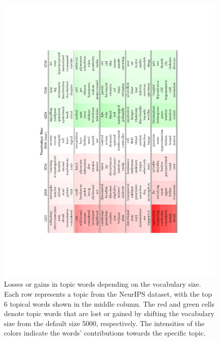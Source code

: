 \begin{figure}[ht]
 	\centering
	\includegraphics[angle=270, width=1.0\textwidth, trim={2.0cm, 4.5cm, 2.0cm,
	4.5cm}]{./ch4/pics/topWordsFull.pdf}
	\vspace*{-40px}
	\caption{Losses or gains in topic words depending on the vocabulary size. Each
	row represents a topic from the NeurIPS dataset, with the top 6 topical words
	shown in the middle column. The red and green cells denote topic words that
	are lost or gained by shifting the vocabulary size from the default size 5000,
	respectively. The intensities of the colors indicate the words' contributions
	towards the specific topic.} 
	\label{fig:top_words}		
\end{figure}